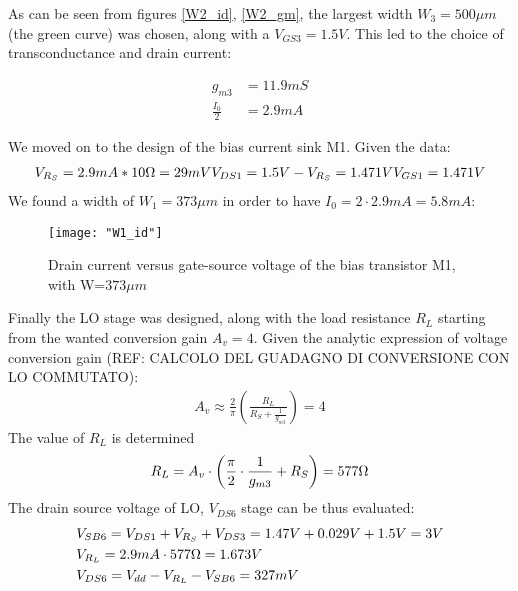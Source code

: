 As can be seen from figures \ref{W2_id}, \ref{W2_gm}, the largest width  \(W_3=500\mu m\) (the green curve) was chosen, along with a \(V_{GS3}=1.5V\). This led to the choice of transconductance and drain current:

\begin{align}
	g_{m3}&=11.9mS \nonumber \\
	\frac{I_0}{2}&=2.9mA \nonumber
\end{align}

We moved on to the design of the bias current sink M1. Given the data:
\begin{align}
	V_{R_S} = 2.9mA*10\ohm=29mV
	V_{DS1}=1.5V-V_{R_S}=1.471V
	V_{GS1}=1.471V
\end{align}
We found a width of \(W_1=373\mu m\) in order to have \(I_0=2\cdot2.9mA=5.8mA\):
\begin{figure}[H]
	\centering
	\texttt{[image: "W1\_id"]}
	\caption{Drain current versus gate-source voltage of the bias transistor M1, with W=\(373\mu m\)}
	\label{W1_id}
\end{figure}

Finally the LO stage was designed, along with the load resistance \(R_L\) starting from the wanted conversion gain \(A_v=4\). Given the analytic expression of voltage conversion gain (REF: CALCOLO DEL GUADAGNO DI CONVERSIONE CON LO COMMUTATO):
\begin{align}
	A_v \approx \frac{2}{\pi}\left( \frac{R_L}{R_S + \frac{1}{g_{m3}}}\right)=4 \nonumber
\end{align}
The value of \(R_L\) is determined
\begin{align}
	R_L=A_v \cdot \left( \frac{\pi}{2} \cdot\frac{1}{g_{m3}} + R_S \right)=577 \ohm
\end{align}
The drain source voltage of LO, \(V_{DS6}\) stage can be thus evaluated:
\begin{align}
	&V_{SB6}=V_{DS1}+V_{R_S}+V_{DS3}= 1.47V+0.029V+1.5V=3V \nonumber \\
	&V_{R_L}=2.9mA\cdot 577\ohm=1.673V \nonumber \\
	&V_{DS6}=V_{dd}-V_{R_L}-V_{SB6}=327mV \nonumber
\end{align}

